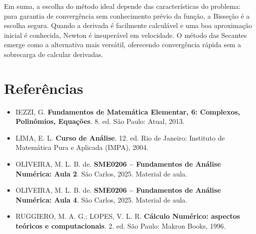 \documentclass[12pt,a4paper]{article}
\begin{document}
Em suma, a escolha do método ideal depende das características do problema: para garantia de convergência sem conhecimento prévio da função, a Bisseção é a escolha segura. Quando a derivada é facilmente calculável e uma boa aproximação inicial é conhecida, Newton é insuperável em velocidade. O método das Secantes emerge como a alternativa mais versátil, oferecendo convergência rápida sem a sobrecarga de calcular derivadas.

\section*{Referências}
\begin{itemize}\itemsep0.3em
  \item IEZZI, G. \textbf{Fundamentos de Matemática Elementar, 6: Complexos, Polinômios, Equações}. 8. ed. São Paulo: Atual, 2013.
  \item LIMA, E. L. \textbf{Curso de Análise}. 12. ed. Rio de Janeiro: Instituto de Matemática Pura e Aplicada (IMPA), 2004.
  \item OLIVEIRA, M. L. B. de. \textbf{SME0206 -- Fundamentos de Análise Numérica: Aula 2}. São Carlos, 2025. Material de aula.
  \item OLIVEIRA, M. L. B. de. \textbf{SME0206 -- Fundamentos de Análise Numérica: Aula 4}. São Carlos, 2025. Material de aula.
  \item RUGGIERO, M. A. G.; LOPES, V. L. R. \textbf{Cálculo Numérico: aspectos teóricos e computacionais}. 2. ed. São Paulo: Makron Books, 1996.
\end{itemize}
\end{document}
